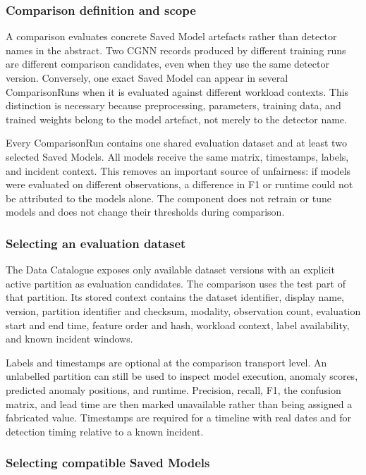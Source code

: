 \subsubsection{Comparison definition and scope}

A comparison evaluates concrete Saved Model artefacts rather than detector names in the abstract. Two CGNN records produced by different training runs are different comparison candidates, even when they use the same detector version. Conversely, one exact Saved Model can appear in several ComparisonRuns when it is evaluated against different workload contexts. This distinction is necessary because preprocessing, parameters, training data, and trained weights belong to the model artefact, not merely to the detector name.

Every ComparisonRun contains one shared evaluation dataset and at least two selected Saved Models. All models receive the same matrix, timestamps, labels, and incident context. This removes an important source of unfairness: if models were evaluated on different observations, a difference in F1 or runtime could not be attributed to the models alone. The component does not retrain or tune models and does not change their thresholds during comparison.

\subsubsection{Selecting an evaluation dataset}

The Data Catalogue exposes only available dataset versions with an explicit active partition as evaluation candidates. The comparison uses the test part of that partition. Its stored context contains the dataset identifier, display name, version, partition identifier and checksum, modality, observation count, evaluation start and end time, feature order and hash, workload context, label availability, and known incident windows.

Labels and timestamps are optional at the comparison transport level. An unlabelled partition can still be used to inspect model execution, anomaly scores, predicted anomaly positions, and runtime. Precision, recall, F1, the confusion matrix, and lead time are then marked unavailable rather than being assigned a fabricated value. Timestamps are required for a timeline with real dates and for detection timing relative to a known incident.

\subsubsection{Selecting compatible Saved Models}

